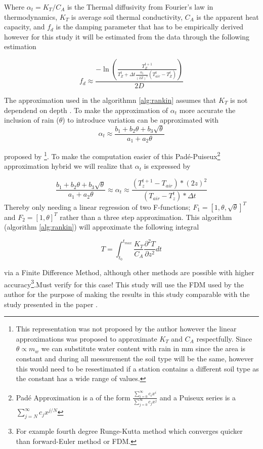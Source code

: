 Where $\alpha_t = K_T/C_A$ is the Thermal diffusivity from Fourier's law in thermodynamics, $K_T$ is average soil thermal conductivity, $C_A$ is the apparent heat capacity, and $f_d$ is the damping parameter that has to be empirically derived however for this study it will be estimated from the data through the following estimation

$$
f_d \approx \frac{-\ln\left(\frac{T_Z^{t+1}}{T_Z^t + \Delta t \frac{\alpha_t}{(2Z)^2} (T^t_{air}-T_Z^t)}\right)}{2D}
$$

The approximation used in the algorithmn \ref{alg:rankin} assumes that $K_T$ is not dependend on depth . To make the approximation of $\alpha_t$ more accurate the inclusion of rain ($\theta$) to introduce variation can be approximated with
$$
\alpha_t \approx \frac{b_1 + b_2\theta +b_3\sqrt{\theta}}{a_1 + a_2\theta}
$$

proposed by \citeauthor{kodesova_thermal_2013}\cite{kodesova_thermal_2013}\footnote{This representation was not proposed by the author however the linear approximations was proposed to approximate $K_T$ and $C_A$ respectfully. Since $\theta \propto m_w$ we can substitute water content with rain in mm since the area is constant and during all messurement the soil type will be the same, however this would need to be resestimated if a station contains a different soil type as the constant has a wide range of values\cite{kodesova_thermal_2013}.}. To make the computation easier of this Padé-Puiseux\footnote{Padé Approximation is a of the form $\frac{\sum_{i=0}^\infty c_ix^i}{\sum_{j=0}^\infty c_jx^j}$ and a Puiseux series is a $\sum_{j=N}^\infty c_jx^{j/N}$} approximation hybrid we will realize that $\alpha_t$ is expressed by

$$
	\frac{b_1 + b_2\theta +b_3\sqrt{\theta}}{a_1 + a_2\theta} \approx \alpha_t \approx \frac{(T_z^{t+1} - T_{air})*(2z)^2}{( T_{air} - T_z^{t})*\Delta t} 
$$
Thereby only needing a linear regression of two F-functions; $F_1 = [ 1,\theta ,\sqrt{\theta} ]^T$ and $F_2 = [1 , \theta]^T$ rather than a three step approximation. This algorithm (algorithm \ref{alg:rankin}) will approximate the following integral

$$
T = \int_{t_0}^{t_{max}} \frac{K_T}{C_A}\frac{\partial^2 T}{\partial z^2} dt
$$

via a Finite Difference Method, although other methods are possible with higher accuracy\footnote{For example fourth degree Runge-Kutta method\cite{runge_ueber_1895} which converges quicker than forward-Euler method or FDM.}.\alert{Must verify for this case!} This study will use the FDM used by the author for the purpose of making the results in this study comparable with the study presented in the paper . 

